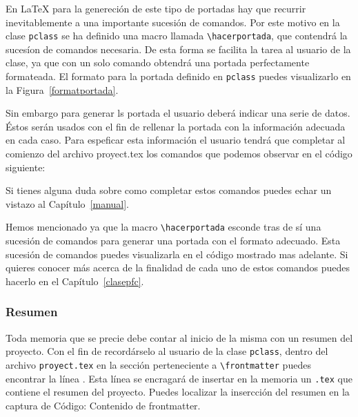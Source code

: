 En \LaTeX{} para la genereci\'on de este tipo de portadas hay que recurrir inevitablemente a una importante sucesi\'on 
de comandos. Por este motivo en la clase \texttt{pclass} se ha definido una macro llamada \verb+\hacerportada+, que 
contendr\'a la suces\'ion de comandos necesaria. De esta forma se facilita la tarea al usuario de la clase, ya que con
un solo comando obtendr\'a una portada perfectamente formateada. El formato para la portada definido en \texttt{pclass}
puedes visualizarlo en la Figura~\ref{formatportada}.


Sin embargo para generar ls portada el usuario deber\'a indicar una serie de datos. \'Estos ser\'an usados con el fin 
de rellenar la portada con la informaci\'on adecuada en cada caso. Para espeficar esta informaci\'on el usuario tendr\'a
que completar al comienzo del archivo proyect.tex los comandos que podemos observar en el c\'odigo siguiente:


Si tienes alguna duda sobre como completar estos comandos puedes echar un vistazo al Cap\'itulo~\ref{manual}.

Hemos mencionado ya que la macro \verb+\hacerportada+ esconde tras de s\'i una sucesi\'on de comandos para generar
una portada con el formato adecuado. Esta sucesi\'on de comandos puedes visualizarla en el c\'odigo mostrado mas 
adelante. Si quieres conocer m\'as acerca de la finalidad de cada uno de estos comandos puedes hacerlo en el
Cap\'itulo~\ref{clasepfc}.


\subsubsection{Resumen}
Toda memoria que se precie debe contar al inicio de la misma con un resumen del proyecto. Con el fin de record\'arselo
al usuario de la clase \texttt{pclass}, dentro del archivo \texttt{proyect.tex} en la secci\'on perteneciente a \verb+\frontmatter+
puedes encontrar la l\'inea \verb++. Esta l\'inea se encragar\'a de insertar en la memoria un \texttt{.tex}
que contiene el resumen del proyecto. Puedes localizar la insercci\'on del resumen en la captura de C\'odigo: Contenido 
de frontmatter.

